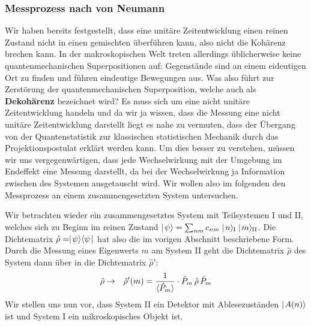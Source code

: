 \subsubsection{Messprozess nach von Neumann}

Wir haben bereits festgestellt, dass eine unitäre Zeitentwicklung einen reinen Zustand nicht in einen gemischten überführen kann, also nicht die Kohärenz brechen kann. In der makroskopischen Welt treten allerdings üblicherweise keine quantenmechanischen Superpositionen auf: Gegenstände sind an einem eideutigen Ort zu finden und führen eindeutige Bewegungen aus. Was also führt zur Zerstörung der quantenmechanischen Superposition, welche auch als {\bf Dekohärenz} bezeichnet wird? Es muss sich um eine nicht unitäre Zeitentwicklung handeln und da wir ja wissen, dass die Messung eine nicht unitäre Zeitentwicklung darstellt liegt es nahe zu vermuten, dass der Übergang von der Quantenstatistik zur klassischen statistischen Mechanik durch das Projektionspostulat erklärt werden kann. Um dies besser zu verstehen, müssen wir uns vergegenwärtigen, dass jede Wechselwirkung mit der Umgebung im Endeffekt eine Messung darstellt, da bei der Wechselwirkung ja Information zwischen des Systemen ausgetauscht wird. Wir wollen also im folgenden den Messprozess an einem zusammengesetzten System untersuchen. 

Wir betrachten wieder ein zusammengesetztes System mit Teilsystemen I und II, welches sich zu Beginn im reinen Zustand $\ket{\psi}=\sum_{nm}c_{nm}\ketI{n}\ketII{m}$. Die Dichtematrix $\hat{\rho}=\mid\!\!\!\,\,{\psi}\rangle\langle{\psi}\!\!\!\,\,\mid$ hat also die im vorigen Abschnitt beschriebene Form. Durch die Messung eines Eigenwerts $m$ am System II geht die Dichtematrix $\hat{\rho}$ des System dann über in die Dichtematrix $\hat{\rho}'$: 
\begin{eqnarray*}
	\hat{\rho} &\to& \hat{\rho}'(m) = \frac{1}{\langle\!\!\,\,\hat{P}_m\!\!\,\,\rangle}\cdot \hat{P}_m\,\hat{\rho}\,\hat{P}_m
\end{eqnarray*}
Wir stellen uns nun vor, dass System II ein Detektor mit Ablesezuständen $\mid\!\!\!\,\,{A(n)}\rangle$ ist und System I ein mikroskopisches Objekt ist. 

